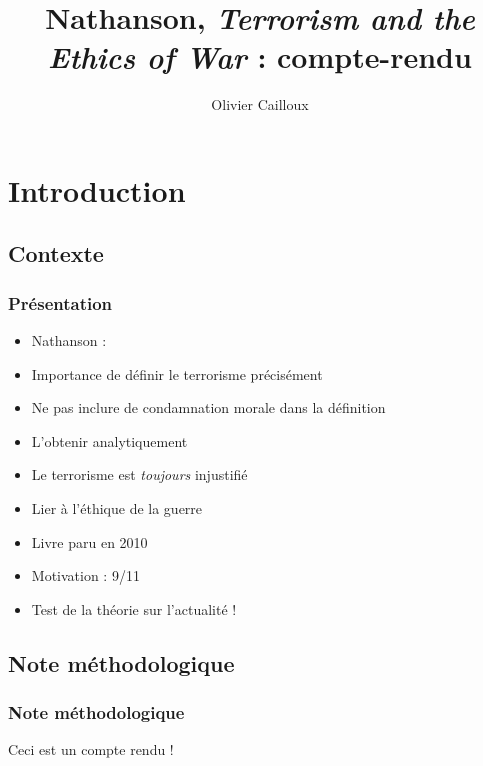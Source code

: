 \documentclass[english, french]{beamer}
\title{Nathanson, \emph{Terrorism and the Ethics of War} : compte-rendu}
\author{Olivier Cailloux}
\date{\formatdate{6}{5}{2025}}
\begin{document}
\begin{frame}[plain]
  \titlepage
\end{frame}
\addtocounter{framenumber}{-1}


\begin{frame}
  \frametitle{}
  \tableofcontents[hideallsubsections, sectionstyle=shaded/show]
\end{frame}

\section{Introduction}
\subsection{Contexte}
\begin{frame}
  \frametitle{Présentation}
  \begin{itemize}
    \item Nathanson :
    \item Importance de définir le terrorisme précisément
    \item Ne pas inclure de condamnation morale dans la définition
    \item L’obtenir analytiquement
    \item Le terrorisme est \emph{toujours} injustifié
    \item Lier à l’éthique de la guerre
    \item Livre paru en 2010
    \item Motivation : 9/11
    \item Test de la théorie sur l’actualité !
  \end{itemize}
\end{frame}

\subsection{Note méthodologique}
\begin{frame}
  \frametitle{Note méthodologique}
  Ceci est un compte rendu !
\end{frame}
\end{document}
